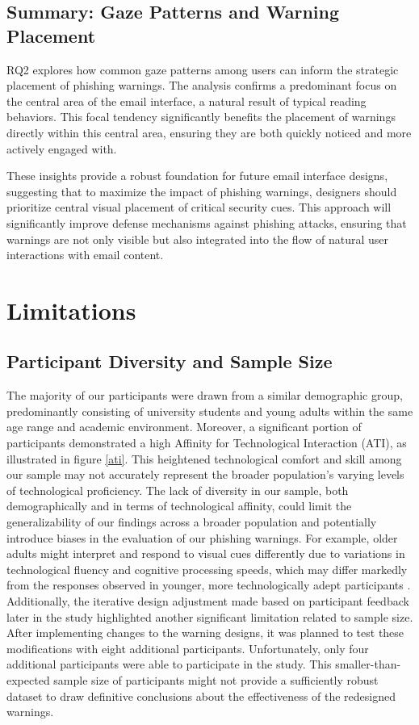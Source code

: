 \documentclass[
  a4paper,  %
  twoside,  %
  bibliography=totoc,
  headsepline,
  cleardoublepage=empty,
  parskip=half,
  draft=false
]{scrbook}
\begin{document}
\subsection{Summary: Gaze Patterns and Warning Placement}

RQ2 explores how common gaze patterns among users can inform the strategic placement of phishing warnings. The analysis confirms a predominant focus on the central area of the email interface, a natural result of typical reading behaviors. This focal tendency significantly benefits the placement of warnings directly within this central area, ensuring they are both quickly noticed and more actively engaged with.

These insights provide a robust foundation for future email interface designs, suggesting that to maximize the impact of phishing warnings, designers should prioritize central visual placement of critical security cues. This approach will significantly improve defense mechanisms against phishing attacks, ensuring that warnings are not only visible but also integrated into the flow of natural user interactions with email content.

\section{Limitations}

\subsection{Participant Diversity and Sample Size}
The majority of our participants were drawn from a similar demographic group, predominantly consisting of university students and young adults within the same age range and academic environment. Moreover, a significant portion of participants demonstrated a high Affinity for Technological Interaction (ATI), as illustrated in figure \ref{ati}. This heightened technological comfort and skill among our sample may not accurately represent the broader population's varying levels of technological proficiency. The lack of diversity in our sample, both demographically and in terms of technological affinity, could limit the generalizability of our findings across a broader population and potentially introduce biases in the evaluation of our phishing warnings. For example, older adults might interpret and respond to visual cues differently due to variations in technological fluency and cognitive processing speeds, which may differ markedly from the responses observed in younger, more technologically adept participants \cite{age}. \newline
Additionally, the iterative design adjustment made based on participant feedback later in the study highlighted another significant limitation related to sample size. After implementing changes to the warning designs, it was planned to test these modifications with eight additional participants. Unfortunately, only four additional participants were able to participate in the study. This smaller-than-expected sample size of participants might not provide a sufficiently robust dataset to draw definitive conclusions about the effectiveness of the redesigned warnings.
\end{document}
